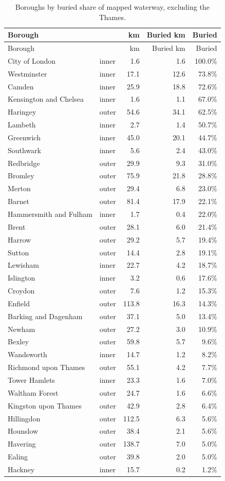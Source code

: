\documentclass[11pt,a4paper]{article}
\begin{document}
\begin{longtable}{llrrr}\caption{Boroughs by buried share of mapped waterway, excluding the Thames.}\label{tab:boroughs}\\\toprule Borough & & km & Buried km & Buried\\\midrule\endfirsthead
\toprule Borough & & km & Buried km & Buried\\\midrule\endhead
City of London & inner & 1.6 & 1.6 & 100.0\%\\
Westminster & inner & 17.1 & 12.6 & 73.8\%\\
Camden & inner & 25.9 & 18.8 & 72.6\%\\
Kensington and Chelsea & inner & 1.6 & 1.1 & 67.0\%\\
Haringey & outer & 54.6 & 34.1 & 62.5\%\\
Lambeth & inner & 2.7 & 1.4 & 50.7\%\\
Greenwich & inner & 45.0 & 20.1 & 44.7\%\\
Southwark & inner & 5.6 & 2.4 & 43.0\%\\
Redbridge & outer & 29.9 & 9.3 & 31.0\%\\
Bromley & outer & 75.9 & 21.8 & 28.8\%\\
Merton & outer & 29.4 & 6.8 & 23.0\%\\
Barnet & outer & 81.4 & 17.9 & 22.1\%\\
Hammersmith and Fulham & inner & 1.7 & 0.4 & 22.0\%\\
Brent & outer & 28.1 & 6.0 & 21.4\%\\
Harrow & outer & 29.2 & 5.7 & 19.4\%\\
Sutton & outer & 14.4 & 2.8 & 19.1\%\\
Lewisham & inner & 22.7 & 4.2 & 18.7\%\\
Islington & inner & 3.2 & 0.6 & 17.6\%\\
Croydon & outer & 7.6 & 1.2 & 15.3\%\\
Enfield & outer & 113.8 & 16.3 & 14.3\%\\
Barking and Dagenham & outer & 37.1 & 5.0 & 13.4\%\\
Newham & outer & 27.2 & 3.0 & 10.9\%\\
Bexley & outer & 59.8 & 5.7 & 9.6\%\\
Wandsworth & inner & 14.7 & 1.2 & 8.2\%\\
Richmond upon Thames & outer & 55.1 & 4.2 & 7.7\%\\
Tower Hamlets & inner & 23.3 & 1.6 & 7.0\%\\
Waltham Forest & outer & 24.7 & 1.6 & 6.6\%\\
Kingston upon Thames & outer & 42.9 & 2.8 & 6.4\%\\
Hillingdon & outer & 112.5 & 6.3 & 5.6\%\\
Hounslow & outer & 38.4 & 2.1 & 5.6\%\\
Havering & outer & 138.7 & 7.0 & 5.0\%\\
Ealing & outer & 39.8 & 2.0 & 5.0\%\\
Hackney & inner & 15.7 & 0.2 & 1.2\%\\
\bottomrule\end{longtable}
\end{document}
